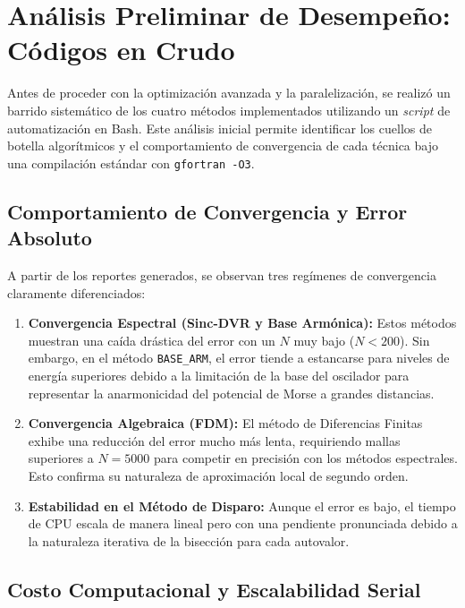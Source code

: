 \documentclass[11pt,fleqn]{article}
\begin{document}

\section{Análisis Preliminar de Desempeño: Códigos en Crudo}

Antes de proceder con la optimización avanzada y la paralelización, se realizó un barrido sistemático de los cuatro métodos implementados utilizando un \textit{script} de automatización en Bash. Este análisis inicial permite identificar los cuellos de botella algorítmicos y el comportamiento de convergencia de cada técnica bajo una compilación estándar con \texttt{gfortran -O3}.

\subsection{Comportamiento de Convergencia y Error Absoluto}

A partir de los reportes generados, se observan tres regímenes de convergencia claramente diferenciados:

\begin{enumerate}
    \item \textbf{Convergencia Espectral (Sinc-DVR y Base Armónica):} Estos métodos muestran una caída drástica del error con un $N$ muy bajo ($N < 200$). Sin embargo, en el método \texttt{BASE\_ARM}, el error tiende a estancarse para niveles de energía superiores debido a la limitación de la base del oscilador para representar la anarmonicidad del potencial de Morse a grandes distancias.
    \item \textbf{Convergencia Algebraica (FDM):} El método de Diferencias Finitas exhibe una reducción del error mucho más lenta, requiriendo mallas superiores a $N=5000$ para competir en precisión con los métodos espectrales. Esto confirma su naturaleza de aproximación local de segundo orden.
    \item \textbf{Estabilidad en el Método de Disparo:} Aunque el error es bajo, el tiempo de CPU escala de manera lineal pero con una pendiente pronunciada debido a la naturaleza iterativa de la bisección para cada autovalor.
\end{enumerate}

\subsection{Costo Computacional y Escalabilidad Serial}
\end{document}
